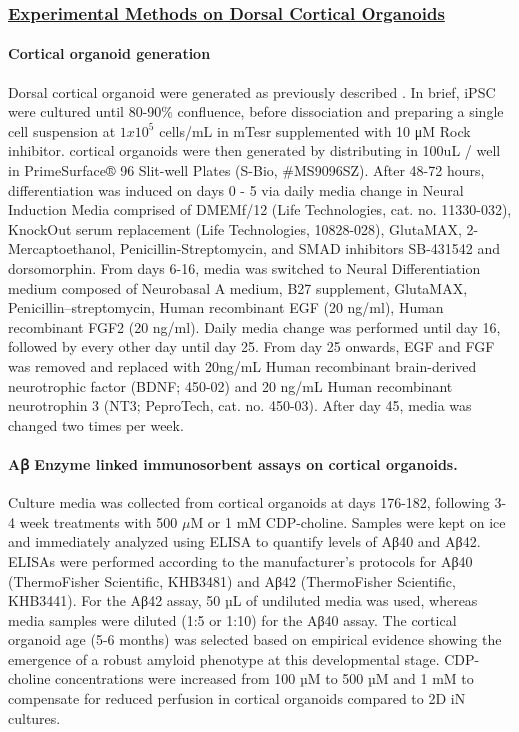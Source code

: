 \subsubsection{\underline{Experimental Methods on Dorsal Cortical Organoids}} 

\paragraph{Cortical organoid generation}
Dorsal cortical organoid were generated as previously described \cite{Sloan2018-ja}. In brief, iPSC were cultured until 80-90\% confluence, before dissociation and preparing a single cell suspension at $1 x 10^5$ cells/mL in mTesr supplemented with 10 μM Rock inhibitor. cortical organoids were then generated by distributing in 100uL / well in PrimeSurface® 96 Slit-well Plates (S-Bio, #MS9096SZ). After 48-72 hours, differentiation was induced on days 0 - 5 via daily media change in Neural Induction Media comprised of DMEMf/12 (Life Technologies, cat. no. 11330-032), KnockOut serum replacement (Life Technologies, 10828-028), GlutaMAX, 2-Mercaptoethanol, Penicillin-Streptomycin, and SMAD inhibitors SB-431542 and dorsomorphin. From days 6-16, media was switched to Neural Differentiation medium composed of Neurobasal A medium, B27 supplement, GlutaMAX, Penicillin–streptomycin, Human recombinant EGF (20 ng/ml), Human recombinant FGF2 (20 ng/ml). Daily media change was performed until day 16, followed by every other day until day 25. From day 25 onwards, EGF and FGF was removed and replaced with 20ng/mL Human recombinant brain-derived neurotrophic factor (BDNF; 450-02) and 20 ng/mL Human recombinant neurotrophin 3 (NT3; PeproTech, cat. no. 450-03). After day 45, media was changed two times per week. 

\paragraph{Aꞵ Enzyme linked immunosorbent assays on cortical organoids.}
Culture media was collected from cortical organoids at days 176-182, following 3-4 week treatments with 500 $\mu$M or 1 mM CDP-choline. Samples were kept on ice and immediately analyzed using ELISA to quantify levels of Aβ40 and Aβ42. ELISAs were performed according to the manufacturer’s protocols for Aβ40 (ThermoFisher Scientific, KHB3481) and Aβ42 (ThermoFisher Scientific, KHB3441). For the Aβ42 assay, 50 µL of undiluted media was used, whereas media samples were diluted (1:5 or 1:10) for the Aβ40 assay. The cortical organoid age (5-6 months) was selected based on empirical evidence showing the emergence of a robust amyloid phenotype at this developmental stage. CDP-choline concentrations were increased from 100 µM to 500 µM and 1 mM to compensate for reduced perfusion in cortical organoids compared to 2D iN cultures.

